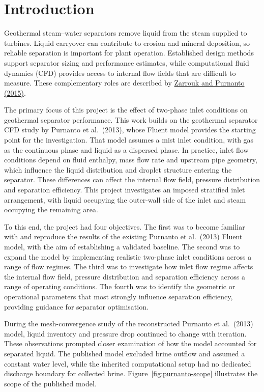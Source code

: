 \section{Introduction}\label{introduction}

Geothermal steam--water separators remove liquid from the steam supplied to turbines. Liquid carryover can contribute to erosion and mineral deposition, so reliable separation is important for plant operation. Established design methods support separator sizing and performance estimates, while computational fluid dynamics (CFD) provides access to internal flow fields that are difficult to measure. These complementary roles are described by \href{https://www.sciencedirect.com/science/article/abs/pii/S0375650514000637}{Zarrouk and Purnanto (2015)}.

The primary focus of this project is the effect of two-phase inlet conditions on geothermal separator performance. This work builds on the geothermal separator CFD study by Purnanto et al.~(2013), whose Fluent model provides the starting point for the investigation. That model assumes a mist inlet condition, with gas as the continuous phase and liquid as a dispersed phase. In practice, inlet flow conditions depend on fluid enthalpy, mass flow rate and upstream pipe geometry, which influence the liquid distribution and droplet structure entering the separator. These differences can affect the internal flow field, pressure distribution and separation efficiency. This project investigates an imposed stratified inlet arrangement, with liquid occupying the outer-wall side of the inlet and steam occupying the remaining area.

To this end, the project had four objectives. The first was to become familiar with and reproduce the results of the existing Purnanto et al.~(2013) Fluent model, with the aim of establishing a validated baseline. The second was to expand the model by implementing realistic two-phase inlet conditions across a range of flow regimes. The third was to investigate how inlet flow regime affects the internal flow field, pressure distribution and separation efficiency across a range of operating conditions. The fourth was to identify the geometric or operational parameters that most strongly influence separation efficiency, providing guidance for separator optimisation.

During the mesh-convergence study of the reconstructed Purnanto et al.~(2013) model, liquid inventory and pressure drop continued to change with iteration. These observations prompted closer examination of how the model accounted for separated liquid. The published model excluded brine outflow and assumed a constant water level, while the inherited computational setup had no dedicated discharge boundary for collected brine. Figure~\ref{fig:purnanto-scope} illustrates the scope of the published model.

